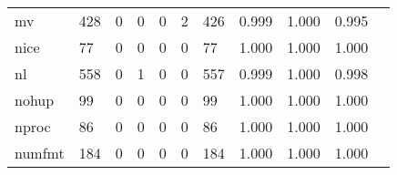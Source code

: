 \begin{longtable}{lp{1.2cm}p{1.2cm}p{1.2cm}p{1.2cm}p{1.2cm}p{1.2cm}p{1.2cm}p{1.2cm}p{1.2cm}p{1.2cm}}
mv        &                                   428 &                                                  0 &                                                  0 &                                                  0 &                                                  2 &                                                426 &                                              0.999 &                                              1.000 &                                              0.995 \\
nice      &                                    77 &                                                  0 &                                                  0 &                                                  0 &                                                  0 &                                                 77 &                                              1.000 &                                              1.000 &                                              1.000 \\
nl        &                                   558 &                                                  0 &                                                  1 &                                                  0 &                                                  0 &                                                557 &                                              0.999 &                                              1.000 &                                              0.998 \\
nohup     &                                    99 &                                                  0 &                                                  0 &                                                  0 &                                                  0 &                                                 99 &                                              1.000 &                                              1.000 &                                              1.000 \\
nproc     &                                    86 &                                                  0 &                                                  0 &                                                  0 &                                                  0 &                                                 86 &                                              1.000 &                                              1.000 &                                              1.000 \\
numfmt    &                                   184 &                                                  0 &                                                  0 &                                                  0 &                                                  0 &                                                184 &                                              1.000 &                                              1.000 &                                              1.000 \\

\end{longtable}
